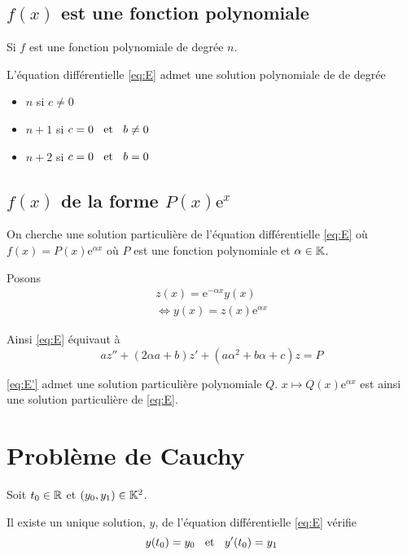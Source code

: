 \subsection{$f(x)$ est une fonction polynomiale}

\begin{prp}
Si $f$ est une fonction polynomiale de degrée $n$.

L'équation différentielle \eqref{eq:E} admet une solution polynomiale de
de degrée
\begin{itemize}
    \item $n$ si $c \neq 0$
    \item $n + 1$ si $c = 0 \;\;\text{ et }\;\; b \neq 0$
    \item $n + 2$ si $c = 0 \;\;\text{ et }\;\; b = 0$
\end{itemize}
\end{prp}
    

\subsection{$f(x)$ de la forme $P(x) \mathrm{e}^x$}

On cherche une solution particulière de l'équation différentielle
\eqref{eq:E} où $f(x) = P(x)\mathrm{e}^{\alpha x}$ où $P$ est une
fonction polynomiale et $\alpha \in \mathbb{K}$.

Posons
\begin{gather*}
    z(x) = \mathrm{e}^{-\alpha x}y(x) \\
    \iff y(x) = z(x)\mathrm{e}^{\alpha x}
\end{gather*}

Ainsi \eqref{eq:E} équivaut à 
\begin{equation} \label{eq:E'}
    a z'' + (2 \alpha a + b) z' + (a \alpha^2 + b \alpha + c) z = P
\end{equation}

\eqref{eq:E'} admet une solution particulière polynomiale $Q$.
$x \mapsto Q(x)\mathrm{e}^{\alpha x}$ est ainsi une solution particulière de
\eqref{eq:E}.

\section{Problème de Cauchy}

\begin{thm}
Soit $t_0 \in \mathbb{R}$ et $(y_0, y_1) \in \mathbb{K}^2$.

Il existe un unique solution, $y$, de l'équation différentielle
\eqref{eq:E} vérifie
\[
    y(t_0) = y_0 \;\;\text{ et }\;\; y'(t_0) = y_1
\]
\end{thm}


